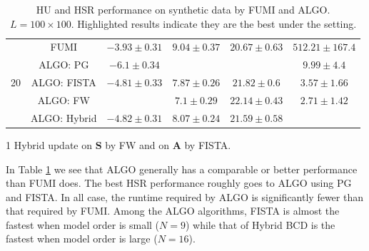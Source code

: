 \begin{table}[h]
{\begin{threeparttable}
\begin{tabular}{|c|c|c|c|c|c|}
\multirow{5}{*}{20} & FUMI                   &                    {$-3.93\pm 0.31$} &                    {$9.04\pm 0.37$} &                    {$20.67\pm 0.63$} &                    {$512.21\pm 167.4$}  \tabularnewline
                    & ALGO: PG               &                    {$-6.1\pm 0.34$}  & \cellcolor{red! 10}{$5.97\pm 0.32$} & \cellcolor{red! 10}{$23.48\pm 0.54$} &                    {$9.99\pm 4.4$}      \tabularnewline
                    & ALGO: FISTA            &                    {$-4.81\pm 0.33$} &                    {$7.87\pm 0.26$} &                    {$21.82\pm 0.6$}  &                    {$3.57\pm 1.66$}     \tabularnewline
                    & ALGO: FW               & \cellcolor{red! 10}{$-6.21\pm 0.39$} &                    {$7.1\pm 0.29$}  &                    {$22.14\pm 0.43$} &                    {$2.71\pm 1.42$}     \tabularnewline
                    & ALGO: Hybrid \tnote{1} &                    {$-4.82\pm 0.31$} &                    {$8.07\pm 0.24$} &                    {$21.59\pm 0.58$} & \cellcolor{red! 10}{$1.62\pm 0.48$}     \tabularnewline \hline
\end{tabular}
\begin{tablenotes}
\item[1] Hybrid update on $\bm S$ by FW and on $\bm A$ by FISTA.
\end{tablenotes}
\end{threeparttable}
}
\caption{HU and HSR performance on synthetic data by FUMI and ALGO.
         $L = 100 \times 100$. Highlighted results indicate they are the best
         under the setting.}
\label{table:ALGO_vs_FUMI_SYNT_MO9}
\end{table}

In Table \ref{table:ALGO_vs_FUMI_SYNT_MO9} we see that ALGO generally has a
comparable or better performance than FUMI does.
The best HSR performance roughly goes to ALGO using PG and FISTA.
In all case, the runtime required by ALGO is significantly fewer than that 
required by FUMI.
Among the ALGO algorithms, FISTA is almost the fastest when model order is
small ($N = 9$) while that of Hybrid BCD is the fastest when model order is
large ($N = 16$).

